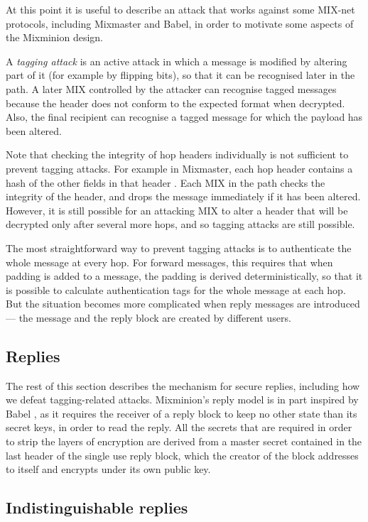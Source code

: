 \documentclass{llncs}
\begin{document}
At this point it is useful to describe an attack that works against some
MIX-net protocols, including Mixmaster and Babel, in order to motivate
some aspects of the Mixminion design.

A {\em tagging attack} is an active attack in which a message is
modified by altering part of it (for example by flipping bits), so
that it can be recognised later in the path.  A later MIX controlled by
the attacker can recognise tagged messages because the header does
not conform to the expected format when decrypted.  Also, the final
recipient can recognise a tagged message for which the payload has
been altered.

Note that checking the integrity of hop headers individually is not
sufficient to prevent tagging attacks.  For example in Mixmaster,
each hop header contains a hash of the other fields in that header
\cite{mixmaster-spec}.
Each MIX in the path checks the integrity of the header, and drops
the message immediately if it has been altered.  However, it is still
possible for an attacking MIX to alter a header that will be decrypted
only after several more hops, and so tagging attacks are still possible.

The most straightforward way to prevent tagging attacks is to
authenticate the whole message at every hop.  For forward messages,
this requires that when padding is added to a message, the padding is
derived deterministically, so that it is possible to calculate
authentication tags for the whole message at each hop.  But
the situation becomes more complicated when reply messages are
introduced --- the message and the reply block are
created by different users.

\subsection{Replies}
\label{subsec:replies}

The rest of this section describes the mechanism for secure replies,
including how we defeat tagging-related attacks. Mixminion's reply
model is in part inspired by Babel \cite{babel}, as it requires the
receiver of a reply block to keep no other state than its secret keys,
in order to read the reply.  All the secrets that are required in
order to strip the layers of encryption are derived from a master
secret contained in the last header of the single use reply block, which
the creator of the block addresses to itself and encrypts under its
own public key.

\subsection{Indistinguishable replies}
\label{subsec:header-swap}
\end{document}
